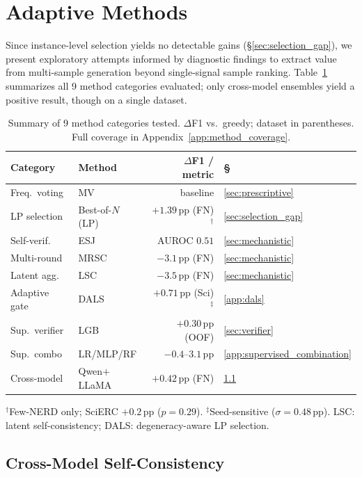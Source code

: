\section{Adaptive Methods}\label{sec:adaptive}

Since instance-level selection yields no detectable gains (\S\ref{sec:selection_gap}), we present exploratory attempts informed by diagnostic findings to extract value from multi-sample generation beyond single-signal sample ranking.
Table~\ref{tab:method_summary} summarizes all 9 method categories evaluated; only cross-model ensembles yield a positive result, though on a single dataset.

\begin{table}[t]
\centering
\footnotesize
\caption{Summary of 9 method categories tested. $\Delta$F1 vs.\ greedy; dataset in parentheses. Full coverage in Appendix~\ref{app:method_coverage}.}
\label{tab:method_summary}
\begin{tabular}{@{}llrl@{}}
\toprule
Category & Method & $\Delta$F1 / metric & \S \\
\midrule
Freq.\ voting & MV & baseline & \ref{sec:prescriptive} \\
LP selection & Best-of-$N$ (LP) & $+1.39$\,pp (FN)$^\dagger$ & \ref{sec:selection_gap} \\
Self-verif. & ESJ & AUROC $0.51$ & \ref{sec:mechanistic} \\
Multi-round & MRSC & $-3.1$\,pp (FN) & \ref{sec:mechanistic} \\
Latent agg. & LSC & $-3.5$\,pp (FN) & \ref{sec:mechanistic} \\
Adaptive gate & DALS & $+0.71$\,pp (Sci)$^\ddagger$ & \ref{app:dals} \\
Sup.\ verifier & LGB & $+0.30$\,pp (OOF) & \ref{sec:verifier} \\
Sup.\ combo & LR/MLP/RF & $-0.4$--$3.1$\,pp & \ref{app:supervised_combination} \\
Cross-model & Qwen$+$LLaMA & $\mathbf{+0.42}$\,pp (FN) & \ref{sec:cross_model} \\
\bottomrule
\end{tabular}

\vspace{1pt}
{\scriptsize $^\dagger$Few-NERD only; SciERC $+0.2$\,pp ($p{=}0.29$). $^\ddagger$Seed-sensitive ($\sigma{=}0.48$\,pp). LSC: latent self-consistency; DALS: degeneracy-aware LP selection.}
\end{table}

\subsection{Cross-Model Self-Consistency}\label{sec:cross_model}


